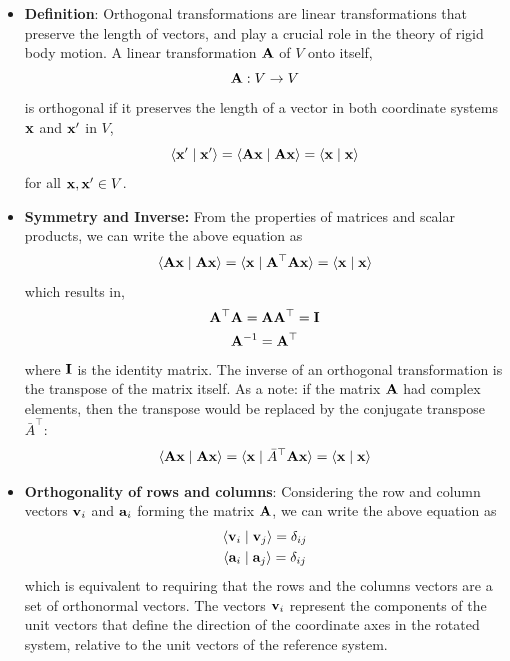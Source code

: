 \documentclass[12pt]{article}
\newcommand{\ip}[2]{\langle #1 \mid #2 \rangle}
\begin{document}
\begin{itemize}
  \item \textbf{Definition}: Orthogonal transformations are linear transformations that
        preserve the length of vectors, and play a crucial role in the theory of rigid body
        motion. A linear transformation $\vb{A}$ of $V$ onto itself,
        \begin{equation}
          \vb{A}: V \to V
        \end{equation}
        is orthogonal if it preserves the length of a vector in both coordinate systems
        $\vb{x}$ and $\vb{x}'$ in $V$,
        \begin{equation}
          \ip{\vb{x}'}{\vb{x}'} = \ip{\vb{A}\vb{x}}{\vb{A}\vb{x}} = \ip{\vb{x}}{\vb{x}}
        \end{equation}
        for all $\vb{x}, \vb{x}' \in V$.

  \item \textbf{Symmetry and Inverse:} From the properties of matrices and scalar products,
        we can write the above equation as
        \begin{equation}
          \ip{\vb{A}\vb{x}}{\vb{A}\vb{x}} = \ip{\vb{x}}{\vb{A}^\top\vb{A}\vb{x}} = \ip{\vb{x}}{\vb{x}}
        \end{equation}
        which results in,
        \begin{equation}
          \begin{gathered}
            \vb{A}^\top\vb{A} = \vb{A}\vb{A}^\top = \vb{I} \\
            \vb{A}^{-1} = \vb{A}^\top
          \end{gathered}
        \end{equation}
        where $\vb{I}$ is the identity matrix. The inverse of an orthogonal transformation is
        the transpose of the matrix itself. As a note: if the matrix $\vb{A}$ had complex
        elements, then the transpose would be replaced by the conjugate transpose
        $\bar{A}^\top$:
        \begin{equation}
          \ip{\vb{A}\vb{x}}{\vb{A}\vb{x}} = \ip{\vb{x}}{\bar{A}^\top\vb{A}\vb{x}} = \ip{\vb{x}}{\vb{x}}
        \end{equation}

  \item \textbf{Orthogonality of rows and columns}: Considering the row and column vectors
        $\vb{v}_i$ and $\vb{a}_i$ forming the matrix $\vb{A}$, we can write the above
        equation as
        \begin{equation}
          \begin{gathered}
            \ip{\vb{v}_i}{\vb{v}_j} = \delta_{ij} \\
            \ip{\vb{a}_i}{\vb{a}_j} = \delta_{ij}
          \end{gathered}
        \end{equation}
        which is equivalent to requiring that the rows and the columns vectors are a set of
        orthonormal vectors. The vectors $\vb{v}_i$ represent the components of the unit
        vectors that define the direction of the coordinate axes in the rotated system,
        relative to the unit vectors of the reference system.


\end{itemize}
\end{document}
